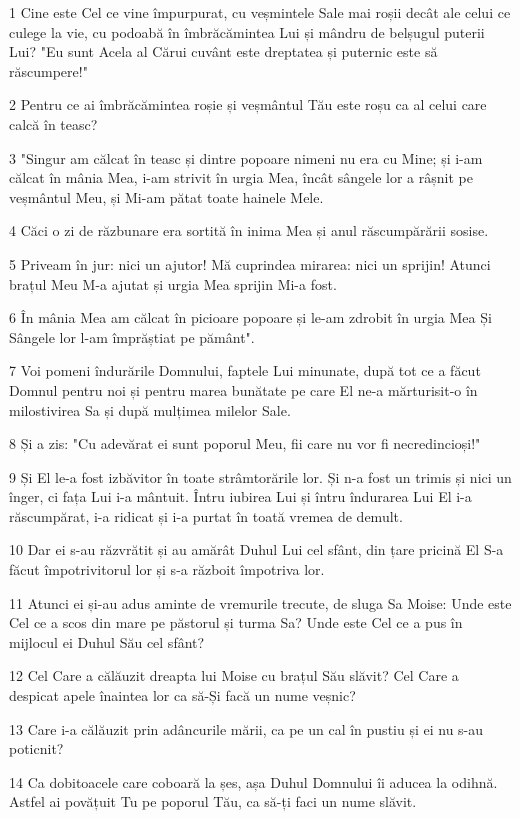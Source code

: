 \par 1 Cine este Cel ce vine împurpurat, cu veșmintele Sale mai roșii decât ale celui ce culege la vie, cu podoabă în îmbrăcămintea Lui și mândru de belșugul puterii Lui? "Eu sunt Acela al Cărui cuvânt este dreptatea și puternic este să răscumpere!"
\par 2 Pentru ce ai îmbrăcămintea roșie și veșmântul Tău este roșu ca al celui care calcă în teasc?
\par 3 "Singur am călcat în teasc și dintre popoare nimeni nu era cu Mine; și i-am călcat în mânia Mea, i-am strivit în urgia Mea, încât sângele lor a râșnit pe veșmântul Meu, și Mi-am pătat toate hainele Mele.
\par 4 Căci o zi de răzbunare era sortită în inima Mea și anul răscumpărării sosise.
\par 5 Priveam în jur: nici un ajutor! Mă cuprindea mirarea: nici un sprijin! Atunci brațul Meu M-a ajutat și urgia Mea sprijin Mi-a fost.
\par 6 În mânia Mea am călcat în picioare popoare și le-am zdrobit în urgia Mea Și Sângele lor l-am împrăștiat pe pământ".
\par 7 Voi pomeni îndurările Domnului, faptele Lui minunate, după tot ce a făcut Domnul pentru noi și pentru marea bunătate pe care El ne-a mărturisit-o în milostivirea Sa și după mulțimea milelor Sale.
\par 8 Și a zis: "Cu adevărat ei sunt poporul Meu, fii care nu vor fi necredincioși!"
\par 9 Și El le-a fost izbăvitor în toate strâmtorările lor. Și n-a fost un trimis și nici un înger, ci fața Lui i-a mântuit. Întru iubirea Lui și întru îndurarea Lui El i-a răscumpărat, i-a ridicat și i-a purtat în toată vremea de demult.
\par 10 Dar ei s-au răzvrătit și au amărât Duhul Lui cel sfânt, din țare pricină El S-a făcut împotrivitorul lor și s-a războit împotriva lor.
\par 11 Atunci ei și-au adus aminte de vremurile trecute, de sluga Sa Moise: Unde este Cel ce a scos din mare pe păstorul și turma Sa? Unde este Cel ce a pus în mijlocul ei Duhul Său cel sfânt?
\par 12 Cel Care a călăuzit dreapta lui Moise cu brațul Său slăvit? Cel Care a despicat apele înaintea lor ca să-Și facă un nume veșnic?
\par 13 Care i-a călăuzit prin adâncurile mării, ca pe un cal în pustiu și ei nu s-au poticnit?
\par 14 Ca dobitoacele care coboară la șes, așa Duhul Domnului îi aducea la odihnă. Astfel ai povățuit Tu pe poporul Tău, ca să-ți faci un nume slăvit.
